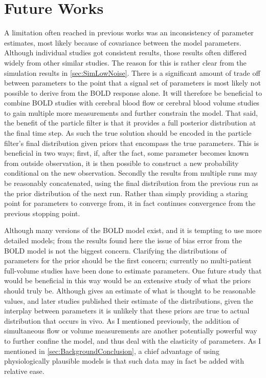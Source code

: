 \section{Future Works}

A limitation often reached in previous works was an inconsistency of
parameter estimates, most likely because of covariance between the model parameters.
Although individual studies got consistent results, those results often differed
widely from other similar studies. The reason for this is rather clear from the
simulation results in \autoref{sec:SimLowNoise}. There is a significant amount of
trade off between parameters to the point that a signal set of parameters
is most likely not possible to derive from the BOLD response alone. It
will therefore be beneficial to combine BOLD studies with cerebral blood
flow or cerebral blood volume studies to gain multiple more measurements and
further constrain the model. That said, the benefit of the particle filter
is that it provides a full posterior distribution at the final time step.
As such the true solution should be encoded in the particle filter's final 
distribution given priors that encompass the true parameters. This is beneficial
in two ways; first, if, after the fact, some parameter becomes known 
from outside observation, it is then possible to construct a new probability
conditional on the new observation. Secondly the results from multiple runs
may be reasonably concatenated, using the final distribution from the previous
run as the prior distribution of the next run. Rather than simply providing a 
staring point for parameters to converge from, it in fact continues convergence
from the previous stopping point. 

Although many versions of the BOLD model exist, and it is tempting to use 
more detailed models; from the results found here the issue of bias error
from the BOLD model is not the biggest concern. Clarifying the distributions
of parameters for the prior should be the first concern; currently no multi-patient
full-volume studies have been done to estimate parameters.
One future study that would be beneficial in this way  would
be an extensive study of what the priors should truly be. Although \cite{Friston2000}
gives an estimate of what is thought to be reasonable values, and later studies
published their estimate of the distributions, given the interplay between
parameters it is unlikely that these priors are true to actual distribution
that occurs in vivo. As I mentioned previously, the addition of simultaneous
flow or volume measurements are another potentially powerful way to further confine the model,
and thus deal with the elasticity of parameters. As I mentioned in 
\autoref{sec:BackgroundConclusion}, a chief advantage of using physiologically
plausible models is that such data may in fact be added with relative ease.

